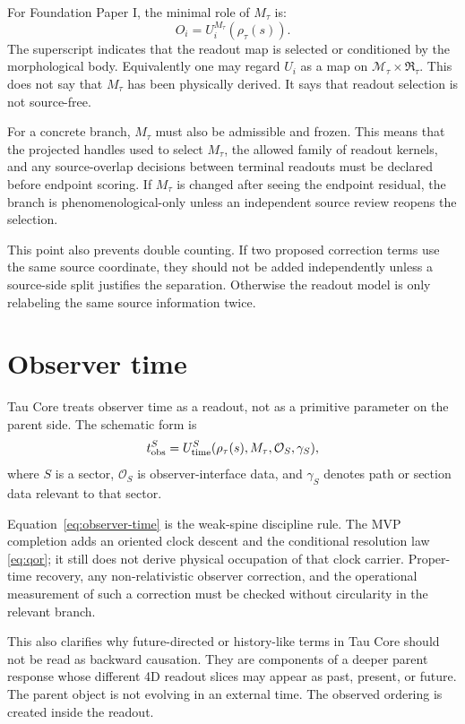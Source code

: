 \documentclass[11pt]{article}
\newcommand{\RTspace}{\mathfrak R_{\tau}}
\newcommand{\Rmap}{\rho_{\tau}}
\newcommand{\Mta}{M_{\tau}}
\begin{document}
For Foundation Paper I, the minimal role of \(\Mta\) is:
\begin{equation}
  O_i = U_i^{\Mta}(\Rmap(s)).
  \label{eq:morph-conditioned}
\end{equation}
The superscript indicates that the readout map is selected or conditioned by
the morphological body.  Equivalently one may regard \(U_i\) as a map on
\(\mathcal M_\tau\times\RTspace\).  This does not say that \(\Mta\) has been
physically derived.  It says that readout selection is not source-free.

For a concrete branch, \(\Mta\) must also be admissible and frozen.  This means
that the projected handles used to select \(\Mta\), the allowed family of
readout kernels, and any source-overlap decisions between terminal readouts must be
declared before endpoint scoring.  If \(\Mta\) is changed after seeing the
endpoint residual, the branch is phenomenological-only unless an independent
source review reopens the selection.

This point also prevents double counting.  If two proposed correction terms
use the same source coordinate, they should not be added independently unless
a source-side split justifies the separation.  Otherwise the readout model is
only relabeling the same source information twice.

\section{Observer time}

Tau Core treats observer time as a readout, not as a primitive parameter on the
parent side.  The schematic form is
\begin{equation}
  t_{\rm obs}^{S}
  =
  U_{\rm time}^{S}(\Rmap(s),\Mta,\mathcal O_S,\gamma_S),
  \label{eq:observer-time}
\end{equation}
where \(S\) is a sector, \(\mathcal O_S\) is observer-interface data, and
\(\gamma_S\) denotes path or section data relevant to that sector.

Equation~\eqref{eq:observer-time} is the weak-spine discipline rule.  The MVP
completion adds an oriented clock descent and the conditional resolution law
\eqref{eq:qor}; it still does not derive physical occupation of that clock
carrier.  Proper-time recovery, any non-relativistic observer correction, and
the operational measurement of such a correction must be checked without
circularity in the relevant branch.

This also clarifies why future-directed or history-like terms in Tau Core
should not be read as backward causation.  They are components of a deeper
parent response whose different 4D readout slices may appear as past, present,
or future.  The parent object is not evolving in an external time.  The
observed ordering is created inside the readout.
\end{document}
